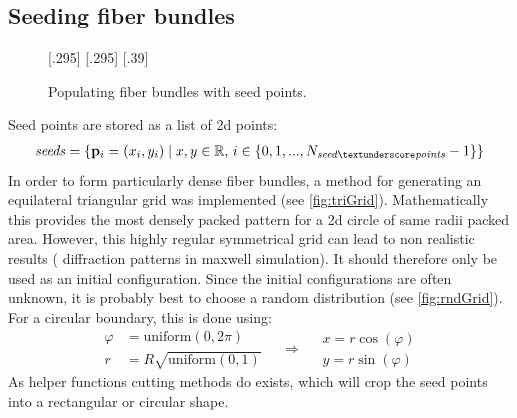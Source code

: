 \subsection{Seeding fiber bundles}\label{sec:seeds}
% 
\begin{figure}[!t]
    \def\tikzheight{0.25\textwidth}
    \centering
    [.295\textwidth]{
    \hfill}
    [.295\textwidth]{
    }\hfill
    [.39\textwidth]{
    }
	\caption{Populating fiber bundles with seed points.}
\end{figure}
% 
Seed points are stored as a list of 2d points:
\begin{align}
\mathit{seeds} = \left\{ \vec{p}_i=(x_i,y_i) \mid x,y \in \mathbb{R} , \, i \in \{0,1,...,N_{\mathit{seed\tu points}}-1\}\right\}
\end{align}
% 
In order to form particularly dense fiber bundles, a method for generating an equilateral triangular grid was implemented (see \ref{fig:triGrid}).
Mathematically this provides the most densely packed pattern for a 2d circle of same radii packed area.
However, this highly regular symmetrical grid can lead to non realistic results (\eg{} diffraction patterns in maxwell simulation).
It should therefore only be used as an initial configuration.
Since the initial configurations are often unknown, it is probably best to choose a random distribution (see \cref{fig:rndGrid}).
For a circular boundary, this is done using:
\begin{equation}
\begin{split}
\varphi &= \mathrm{uniform}(0,2 \pi) \\
r &= R \sqrt{\mathrm{uniform}(0,1)}
\end{split}
\quad\Rightarrow\quad
\begin{split}
x = r \cos(\varphi)\\
y = r \sin(\varphi)
\end{split}
\end{equation}
% 
As helper functions cutting methods do exists, which will crop the seed points into a rectangular or circular shape.
% 
% 
% 
